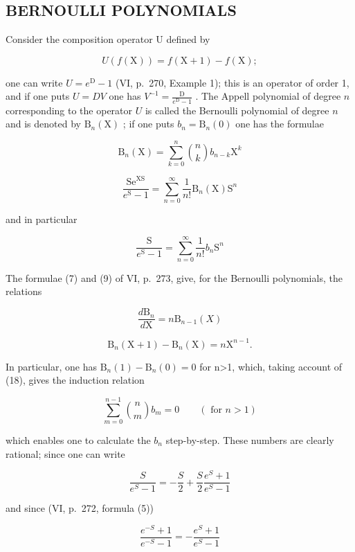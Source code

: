 \subsection{BERNOULLI POLYNOMIALS}

Consider the composition operator U defined by

\[
U (f (\mathrm{X})) = f (\mathrm{X} + 1) - f (\mathrm{X});
\]

one can write \(U = e^{\mathrm{D}} - 1\) (VI, p.~270, Example 1); this is an operator of order 1, and if one puts \(U = DV\) one has \(V^{-1} = \frac{\mathrm{D}}{e^{\mathrm{D}} - 1}\) . The Appell polynomial of degree \(n\) corresponding to the operator \(U\) is called the Bernoulli polynomial of degree \(n\) and is denoted by \(\mathrm{B}_n(\mathrm{X})\) ; if one puts \(b_n = \mathrm{B}_n(0)\) one has the formulae

\[
\mathrm{B} _ {n} (\mathrm{X}) = \sum_ {k = 0} ^ {n} \binom{n}{k} b _ {n - k} \mathrm{X} ^ {k}\tag{18}
\]

\[
\frac {\mathrm{Se} ^ {\mathrm{XS}}}{e ^ {\mathrm{S}} - 1} = \sum_ {n = 0} ^ {\infty} \frac {1}{n !} \mathrm{B} _ {n} (\mathrm{X}) \mathrm{S} ^ {n}\tag{19}
\]

and in particular

\[
{\frac {\mathrm{S}}{e ^ {\mathrm{S}} - 1}} = \sum_ {n = 0} ^ {\infty} {\frac {1}{n !}} b _ {n} \mathrm{S} ^ {n}\tag{20}
\]

The formulae (7) and (9) of VI, p.~273, give, for the Bernoulli polynomials, the relations

\[
\frac {d \mathrm{B} _ {n}}{d \mathrm{X}} = n \mathrm{B} _ {n - 1} (X)\tag{21}
\]

\[
\mathrm{B} _ {n} (\mathrm{X} + 1) - \mathrm{B} _ {n} (\mathrm{X}) = n \mathrm{X} ^ {n - 1}.\tag{22}
\]

In particular, one has \(\mathrm{B}_{n}(1)-\mathrm{B}_{n}(0)=0\) for n\textgreater1, which, taking account of (18), gives the induction relation

\[
\sum_ {m = 0} ^ {n - 1} \binom {n} {m} b _ {m} = 0 \qquad (\text { for } n > 1)\tag{23}
\]

which enables one to calculate the \(b_{n}\) step-by-step. These numbers are clearly rational; since one can write

\[
{\frac {S}{e ^ {S} - 1}} = - {\frac {S}{2}} + {\frac {S}{2}} {\frac {e ^ {S} + 1}{e ^ {S} - 1}}
\]

and since (VI, p.~272, formula (5))

\[
\frac {e ^ {- S} + 1}{e ^ {- S} - 1} = - \frac {e ^ {S} + 1}{e ^ {S} - 1}
\]

